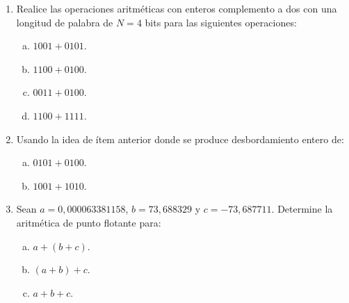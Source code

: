 \documentclass[
	spanish,
	9pt,
	utf8,
	xcolor=table,
	handout,
	aspectratio=1610,
	professionalfonts,
	notheorems,
	mathserif,
]{beamer}
\newcounter{savedenum}
\newcommand*{\resume}{\setcounter{enumi}{\thesavedenum}}
\begin{document}
\begin{frame}
	\begin{enumerate}
		\resume

		\item
		      Realice las operaciones aritméticas con enteros complemento a dos con una longitud de palabra de $N=4$ bits para las siguientes operaciones:

		      \begin{multicols}{4}
			      \begin{enumerate}[a)]
				      \item
				            $1001+0101$.

				      \item
				            $1100+0100$.

				      \item
				            $0011+0100$.

				      \item
				            $1100+1111$.
			      \end{enumerate}
		      \end{multicols}

		\item
		      Usando la idea de ítem anterior donde se produce desbordamiento entero de:
		      \begin{multicols}{2}
			      \begin{enumerate}[a)]
				      \item
				            $0101+0100$.

				      \item
				            $1001+1010$.
			      \end{enumerate}
		      \end{multicols}

		\item
		      Sean $a=0,000063381158$, $b=73,688329$ y $c=-73,687711$. Determine la aritmética de punto flotante para:
		      \begin{multicols}{3}
			      \begin{enumerate}[a)]
				      \item
				            $a+(b+c)$.

				      \item
				            $(a+b)+c$.

				      \item
				            $a+b+c$.
			      \end{enumerate}
		      \end{multicols}


\end{enumerate}
\end{frame}
\end{document}
